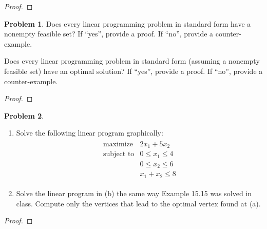 \documentclass[12pt]{article}
\theoremstyle{definition}
\newtheorem{problem}{Problem}
\begin{document}
\begin{proof}
\end{proof}
\newpage


\begin{problem}
  Does every linear programming problem in standard form have a nonempty feasible set?
  If ``yes'', provide a proof. If ``no'', provide a counter-example.

  Does every linear programming problem in standard form (assuming a nonempty feasible
  set) have an optimal solution? If ``yes'', provide a proof. If ``no'', provide a counter-example.
\end{problem}

\begin{proof}
\end{proof}
\newpage


\begin{problem}
  \begin{enumerate}
    \item Solve the following linear program graphically:
      \begin{align*}
        \begin{array}{ll}
          \text{maximize} & 2x_1 + 5x_2 \\
          \text{subject to} & 0 \leq x_1 \leq 4 \\
          & 0 \leq x_2 \leq 6 \\
          & x_1 + x_2 \leq 8
        \end{array}
      \end{align*}
    \item Solve the linear program in (b) the same way Example 15.15 was solved in class.
      Compute only the vertices that lead to the optimal vertex found at (a).
  \end{enumerate}
\end{problem}

\begin{proof}
\end{proof}
\end{document}
